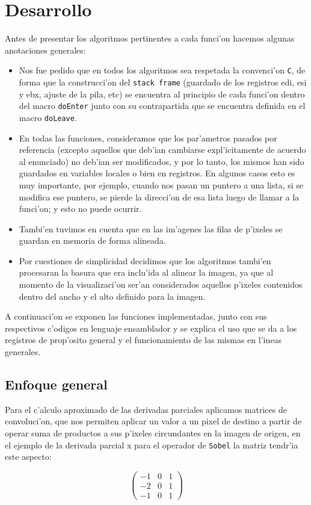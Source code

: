 \documentclass[11pt]{article}
\begin{document}
\section{Desarrollo}
Antes de presentar los algoritmos pertinentes a cada funci'on hacemos algunas anotaciones generales:
\begin{itemize}
\item Nos fue pedido que en todos los algoritmos sea respetada la convenci'on \verb'C', de forma que la construcci'on del \verb'stack frame' (guardado de los registros edi, esi y ebx, ajuste de la pila, etc) se encuentra al principio de cada funci'on dentro del macro \verb'doEnter' junto con su contrapartida que se encuentra definida en el macro \verb'doLeave'.
\item En todas las funciones, consideramos que los par'ametros pasados por referencia (excepto aquellos que deb'ian cambiarse expl'icitamente de acuerdo al enunciado) no deb'ian ser modificados, y por lo tanto, los mismos han sido guardados en variables locales o bien en registros. En algunos casos esto es muy importante, por ejemplo, cuando nos pasan un puntero a una lista, si se modifica ese puntero, se pierde la direcci'on de esa lista luego de llamar a la funci'on; y esto no puede ocurrir.
\item Tambi'en tuvimos en cuenta que en las im'agenes las filas de p'ixeles se guardan en memoria de forma alineada.
\item Por cuestiones de simplicidad decidimos que los algoritmos tambi'en procesaran la basura que era inclu'ida al alinear la imagen, ya que al momento de la visualizaci'on ser'an considerados aquellos p'ixeles contenidos dentro del ancho y el alto definido para la imagen.
\end{itemize}
A continuaci'on se exponen las funciones implementadas, junto con sus respectivos c'odigos en lenguaje ensamblador y se explica el uso que se da a los registros de prop'osito general y el funcionamiento de las mismas en l'ineas generales.
\subsection{Enfoque general}
Para el c'alculo aproximado de las derivadas parciales aplicamos matrices de convoluci'on, que nos permiten aplicar un valor a un pixel de destino a partir de operar suma de productos a sus p'ixeles circundantes en la imagen de origen, en el ejemplo de la derivada parcial x para el operador de \verb'Sobel' la matriz tendr'ia este aspecto:
\begin{center}
\begin{minipage}{5in}
\[ \left( \begin{array}{ccc}
-1 & 0 & 1 \\
-2 & 0 & 1 \\
-1 & 0 & 1 \end{array} \right)\]
\end{minipage}
\end{center}
\end{document}
